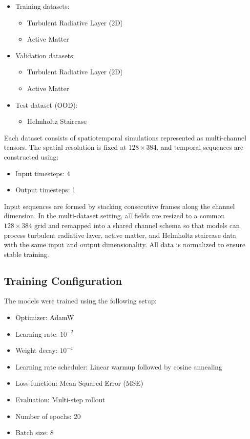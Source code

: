 \documentclass[
]{article}
\providecommand{\tightlist}{%
  \setlength{\itemsep}{0pt}\setlength{\parskip}{0pt}}
\begin{document}
\begin{itemize}
\tightlist
\item
  Training datasets:

  \begin{itemize}
  \tightlist
  \item
    Turbulent Radiative Layer (2D)
  \item
    Active Matter
  \end{itemize}
\item
  Validation datasets:

  \begin{itemize}
  \tightlist
  \item
    Turbulent Radiative Layer (2D)
  \item
    Active Matter
  \end{itemize}
\item
  Test dataset (OOD):

  \begin{itemize}
  \tightlist
  \item
    Helmholtz Staircase
  \end{itemize}
\end{itemize}

Each dataset consists of spatiotemporal simulations represented as
multi-channel tensors. The spatial resolution is fixed at
\(128 \times 384\), and temporal sequences are constructed using:

\begin{itemize}
\tightlist
\item
  Input timesteps: 4
\item
  Output timesteps: 1
\end{itemize}

Input sequences are formed by stacking consecutive frames along the
channel dimension. In the multi-dataset setting, all fields are resized
to a common \(128 \times 384\) grid and remapped into a shared channel
schema so that models can process turbulent radiative layer, active
matter, and Helmholtz staircase data with the same input and output
dimensionality. All data is normalized to ensure stable training.

\subsection{Training Configuration}\label{training-configuration}

The models were trained using the following setup:

\begin{itemize}
\tightlist
\item
  Optimizer: AdamW
\item
  Learning rate: \(10^{-2}\)
\item
  Weight decay: \(10^{-4}\)
\item
  Learning rate scheduler: Linear warmup followed by cosine annealing
\item
  Loss function: Mean Squared Error (MSE)
\item
  Evaluation: Multi-step rollout
\item
  Number of epochs: 20
\item
  Batch size: 8
\end{itemize}
\end{document}

